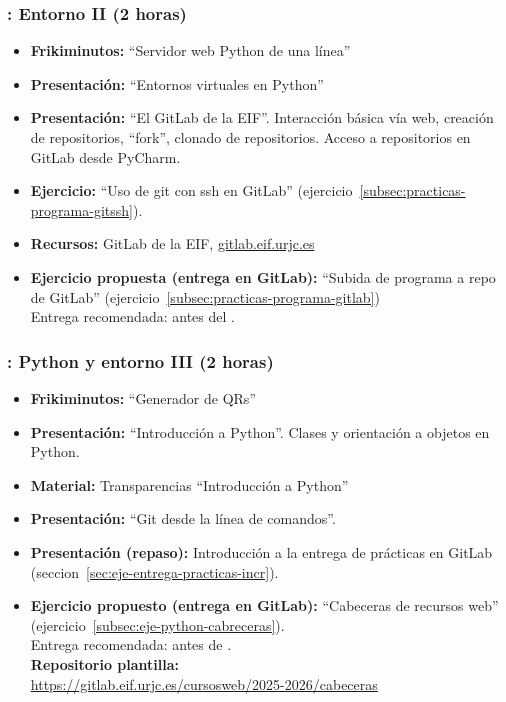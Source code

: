 \documentclass[a4paper,12pt]{article}
\begin{document}
\subsubsection{\juevesB: Entorno II  (2 horas)}
\label{cal:juevesB}

\begin{itemize}
\item \textbf{Frikiminutos:} ``Servidor web Python de una línea''
\item \textbf{Presentación:} ``Entornos virtuales en Python''
\item \textbf{Presentación:} ``El GitLab de la EIF''. Interacción básica vía web, creación de repositorios, ``fork'', clonado de repositorios. Acceso a repositorios en GitLab desde PyCharm.
\item \textbf{Ejercicio:} ``Uso de git con ssh en GitLab'' (ejercicio~\ref{subsec:practicas-programa-gitssh}).
\item \textbf{Recursos:} GitLab de la EIF, \url{gitlab.eif.urjc.es}
\item \textbf{Ejercicio propuesta (entrega en GitLab):} ``Subida de programa a repo de GitLab'' (ejercicio~\ref{subsec:practicas-programa-gitlab}) \\
   Entrega recomendada: antes del \juevesB.
\end{itemize}

\subsubsection{\juevesC: Python y entorno III  (2 horas)}
\label{cal:juevesC}

\begin{itemize}
\item \textbf{Frikiminutos:} ``Generador de QRs''
\item \textbf{Presentación:} ``Introducción a Python''. Clases y orientación a objetos en Python.
\item \textbf{Material:} Transparencias ``Introducción a Python''
\item \textbf{Presentación:} ``Git desde la línea de comandos''.
\item \textbf{Presentación (repaso):} Introducción a la entrega de prácticas en GitLab (seccion~\ref{sec:eje-entrega-practicas-incr}).
\item \textbf{Ejercicio propuesto (entrega en GitLab):} ``Cabeceras de recursos web'' (ejercicio~\ref{subsec:eje-python-cabreceras}). \\
Entrega recomendada: antes de \juevesD. \\
\textbf{Repositorio plantilla:} \\
\url{https://gitlab.eif.urjc.es/cursosweb/2025-2026/cabeceras}
\end{itemize}
\end{document}
